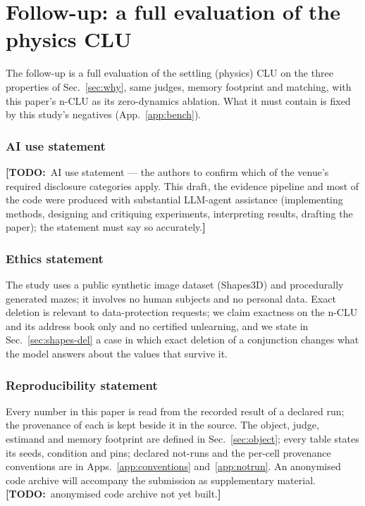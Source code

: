 \documentclass{article} %
\newcommand{\TODO}[1]{{\color{orange}\textbf{[TODO:}~#1\textbf{]}}}
\begin{document}
\section{Follow-up: a full evaluation of the physics CLU}
\label{sec:followup}

The follow-up is a full evaluation of the settling (physics) CLU on the three properties of
Sec.~\ref{sec:why}, same judges, memory footprint and matching, with this paper's n-CLU as its zero-dynamics
ablation. What it must contain is fixed by this study's negatives (App.~\ref{app:bench}).

\subsubsection*{AI use statement}
\TODO{AI use statement --- the authors to confirm which of the venue's required disclosure categories
apply. This draft, the evidence pipeline and most of the code were produced with substantial LLM-agent
assistance (implementing methods, designing and critiquing experiments, interpreting results,
drafting the paper); the statement must say so accurately.}

\subsubsection*{Ethics statement}
The study uses a public synthetic image dataset (Shapes3D) and procedurally generated mazes; it
involves no human subjects and no personal data. Exact deletion is relevant to data-protection
requests; we claim exactness on the n-CLU and its address book only and no certified unlearning, and
we state in Sec.~\ref{sec:shapes-del} a case in which exact deletion of a conjunction changes what the
model answers about the values that survive it.

\subsubsection*{Reproducibility statement}
Every number in this paper is read from the recorded result of a declared run;
the provenance of each is kept beside it in the source. The object, judge, estimand and memory footprint are
defined in Sec.~\ref{sec:object}; every table states its seeds, condition and pins; declared
not-runs and the per-cell provenance conventions are in
Apps.~\ref{app:conventions} and~\ref{app:notrun}. An anonymised code archive will accompany the
submission as supplementary material. \TODO{anonymised code archive not yet built.}
\end{document}
